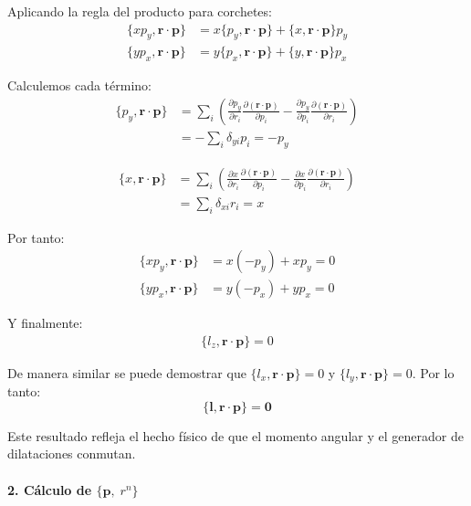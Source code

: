 \documentclass[12pt]{article}
\begin{document}
\begin{enumerate}
  Aplicando la regla del producto para corchetes:
  \begin{align}
  \{xp_y, \mathbf{r}\cdot\mathbf{p}\} &= x\{p_y, \mathbf{r}\cdot\mathbf{p}\} + \{x, \mathbf{r}\cdot\mathbf{p}\}p_y \\
  \{yp_x, \mathbf{r}\cdot\mathbf{p}\} &= y\{p_x, \mathbf{r}\cdot\mathbf{p}\} + \{y, \mathbf{r}\cdot\mathbf{p}\}p_x
  \end{align}

  Calculemos cada término:
  \begin{align}
  \{p_y, \mathbf{r}\cdot\mathbf{p}\} &= \sum_i\left(\frac{\partial p_y}{\partial r_i}\frac{\partial(\mathbf{r}\cdot\mathbf{p})}{\partial p_i} - \frac{\partial p_y}{\partial p_i}\frac{\partial(\mathbf{r}\cdot\mathbf{p})}{\partial r_i}\right) \\
  &= -\sum_i \delta_{yi}p_i = -p_y
  \end{align}

  \begin{align}
  \{x, \mathbf{r}\cdot\mathbf{p}\} &= \sum_i\left(\frac{\partial x}{\partial r_i}\frac{\partial(\mathbf{r}\cdot\mathbf{p})}{\partial p_i} - \frac{\partial x}{\partial p_i}\frac{\partial(\mathbf{r}\cdot\mathbf{p})}{\partial r_i}\right) \\
  &= \sum_i \delta_{xi}r_i = x
  \end{align}

  Por tanto:
  \begin{align}
  \{xp_y, \mathbf{r}\cdot\mathbf{p}\} &= x(-p_y) + xp_y = 0 \\
  \{yp_x, \mathbf{r}\cdot\mathbf{p}\} &= y(-p_x) + yp_x = 0
  \end{align}

  Y finalmente:
  \begin{align}
  \{l_z, \mathbf{r}\cdot\mathbf{p}\} = 0
  \end{align}

  De manera similar se puede demostrar que $\{l_x, \mathbf{r}\cdot\mathbf{p}\} = 0$ y $\{l_y, \mathbf{r}\cdot\mathbf{p}\} = 0$. Por lo tanto:
  \[
  \{\mathbf{l}, \mathbf{r}\cdot\mathbf{p}\} = \mathbf{0}
  \]

  Este resultado refleja el hecho físico de que el momento angular y el generador de dilataciones conmutan.

  \paragraph{2. Cálculo de $\{\mathbf p,\;r^n\}$}


\end{enumerate}
\end{document}
